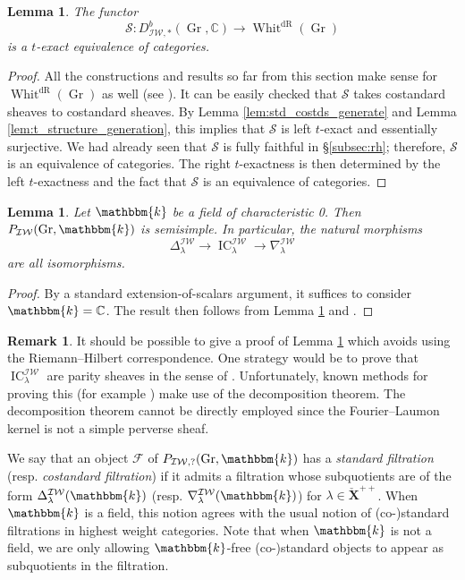 \documentclass{amsart}
\newcommand{\C}{\mathbb{C}}
\renewcommand{\k}{\mathbbm{k}}
\DeclareMathOperator{\dR}{dR}
\newcommand{\scrF}{\mathcal{F}}
\newcommand{\scrS}{\mathcal{S}}
\newcommand{\bfXv}{\check{\mathbf{X}}}
\newcommand{\IW}{\mathcal{IW}}
\DeclareMathOperator{\IC}{IC}
\DeclareMathOperator{\Gr}{Gr}
\DeclareMathOperator{\Whit}{Whit}
\newtheorem{lemma}[subsubsection]{Lemma}
\theoremstyle{definition}
\newtheorem{remark}[subsubsection]{Remark}
\begin{document}
    \begin{lemma}\label{lem:rh_perv_t_exact}
        The functor
        \[\scrS : D_{\IW, *}^b (\Gr, \C) \to \Whit^{\dR} (\Gr)\]
        is a $t$-exact equivalence of categories. 
    \end{lemma}
    \begin{proof}
        All the constructions and results so far from this section make sense for $\Whit^{\dR} (\Gr)$ as well (see \cite{ABBGM}).
        It can be easily checked that $\scrS$ takes costandard sheaves to costandard sheaves. By Lemma \ref{lem:std_costds_generate} and Lemma \ref{lem:t_structure_generation}, this implies that $\scrS$ is left $t$-exact and essentially surjective.
        We had already seen that $\scrS$ is fully faithful in \S\ref{subsec:rh}; therefore, $\scrS$ is an equivalence of categories. 
        The right $t$-exactness is then determined by the left $t$-exactness and the fact that $\scrS$ is an equivalence of categories.
    \end{proof}

    \begin{lemma}\label{lem:semisimple_char_0}
        Let $\k$ be a field of characteristic 0. Then $P_{\IW} (\Gr, \k)$ is semisimple. In particular, the natural morphisms
        \[\Delta_{\lambda}^{\IW} \to \IC_{\lambda}^{\IW} \to \nabla_{\lambda}^{\IW}\]
        are all isomorphisms.
    \end{lemma}
    \begin{proof}
        By a standard extension-of-scalars argument, it suffices to consider $\k = \C$.
        The result then follows from Lemma \ref{lem:rh_perv_t_exact} and \cite[Corollary 2.2.3]{ABBGM}.
    \end{proof}

    \begin{remark}
        It should be possible to give a proof of Lemma \ref{lem:semisimple_char_0} which avoids using the Riemann--Hilbert correspondence.
        One strategy would be to prove that $\IC_{\lambda}^{\IW}$ are parity sheaves in the sense of \cite{JMW}.
        Unfortunately, known methods for proving this (for example \cite[Lemma 3.4]{BGMRR}) make use of the decomposition theorem. 
        The decomposition theorem cannot be directly employed since the Fourier--Laumon kernel is not a simple perverse sheaf.  
    \end{remark}

    We say that an object $\scrF$ of $P_{\IW, ?} (\Gr, \k)$ has a \emph{standard filtration} (resp. \emph{costandard filtration}) if it admits a filtration whose subquotients are of the form $\Delta_{\lambda}^{\IW} (\k)$ (resp. $\nabla_{\lambda}^{\IW} (\k)$) for $\lambda \in \bfXv^{++}$.
    When $\k$ is a field, this notion agrees with the usual notion of (co-)standard filtrations in highest weight categories.
    Note that when $\k$ is not a field, we are only allowing $\k$-free (co-)standard objects to appear as subquotients in the filtration.
\end{document}
